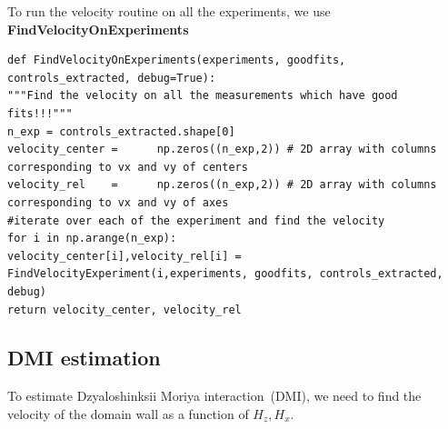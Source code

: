 \documentclass[12pt, twoside, a4paper]{article}
\begin{document}
%
To run the velocity routine on all the experiments, we use \textbf{FindVelocityOnExperiments}
%
\begin{verbatim}
def FindVelocityOnExperiments(experiments, goodfits, controls_extracted, debug=True):
"""Find the velocity on all the measurements which have good fits!!!"""
n_exp = controls_extracted.shape[0]
velocity_center =      np.zeros((n_exp,2)) # 2D array with columns corresponding to vx and vy of centers
velocity_rel    =      np.zeros((n_exp,2)) # 2D array with columns corresponding to vx and vy of axes
#iterate over each of the experiment and find the velocity
for i in np.arange(n_exp):
velocity_center[i],velocity_rel[i] = FindVelocityExperiment(i,experiments, goodfits, controls_extracted, debug)
return velocity_center, velocity_rel
\end{verbatim}
%
\clearpage



\subsection{DMI estimation}
To estimate Dzyaloshinksii Moriya interaction~(DMI), we need to find the velocity of the domain wall as a function of $H_z, H_x$.


\end{document}
